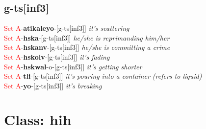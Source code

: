 \documentclass[oneside,openany]{book}%
\begin{document}
\subsection*{g-ts[inf3]}%
\textcolor{Red}{Set A}{-}\textbf{atikaleyo}{-}[g-ts[inf3]] \textit{ it's scattering} \\%
\textcolor{Red}{Set A}{-}\textbf{hska}{-}[g-ts[inf3]] \textit{ he/she is reprimanding him/her} \\%
\textcolor{Red}{Set A}{-}\textbf{hskanv}{-}[g-ts[inf3]] \textit{ he/she is committing a crime} \\%
\textcolor{Red}{Set A}{-}\textbf{hskolv}{-}[g-ts[inf3]] \textit{ it's fading} \\%
\textcolor{Red}{Set A}{-}\textbf{hskwal}{-}o{-}[g-ts[inf3]] \textit{ it's getting shorter} \\%
\textcolor{Red}{Set A}{-}\textbf{tli}{-}[g-ts[inf3]] \textit{ it's pouring into a container (refers to liquid)} \\%
\textcolor{Red}{Set A}{-}\textbf{yo}{-}[g-ts[inf3]] \textit{ it's breaking} \\%
\vspace{1em}%
\needspace{3in}%
\section*{Class: hih}%
%
\needspace{1in}%
\end{document}
